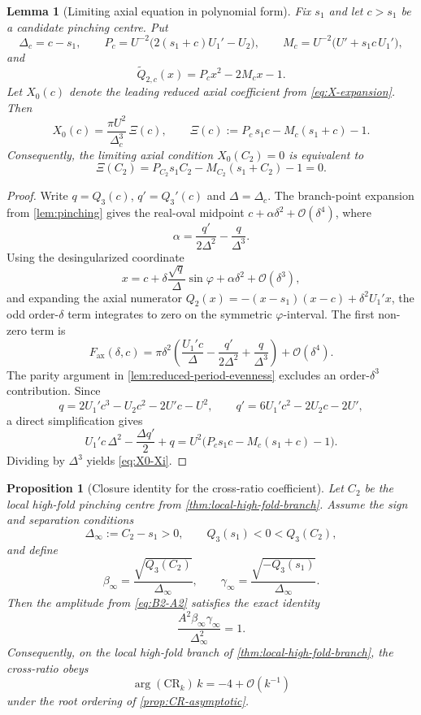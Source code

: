 \documentclass[11pt,a4paper]{article}
\theoremstyle{plain}
\newtheorem{proposition}[theorem]{Proposition}
\newtheorem{lemma}[theorem]{Lemma}
\theoremstyle{definition}
\theoremstyle{remark}
\newcommand{\Oo}{\mathcal{O}}
\begin{document}
\begin{lemma}[Limiting axial equation in polynomial form]
\label{lem:C1-limiting-axial}
Fix $s_1$ and let $c>s_1$ be a candidate pinching centre.  Put
\[
  \Delta_c=c-s_1,\qquad
  P_c=U^{-2}\bigl(2(s_1+c)U_1'-U_2\bigr),\qquad
  M_c=U^{-2}\bigl(U'+s_1c\,U_1'\bigr),
\]
and
\[
  \tilde Q_{2,c}(x)=P_cx^2-2M_cx-1 .
\]
Let $X_0(c)$ denote the leading reduced axial coefficient from
\cref{eq:X-expansion}.  Then
\begin{equation}\label{eq:X0-Xi}
  X_0(c)
  =
  \frac{\pi U^2}{\Delta_c^3}\,
  \Xi(c),
  \qquad
  \Xi(c):=P_c\,s_1c-M_c(s_1+c)-1 .
\end{equation}
Consequently, the limiting axial condition $X_0(C_2)=0$ is
equivalent to
\begin{equation}\label{eq:Xi-zero}
  \Xi(C_2)=P_{C_2}s_1C_2-M_{C_2}(s_1+C_2)-1=0 .
\end{equation}
\end{lemma}

\begin{proof}
Write $q=Q_3(c)$, $q'=Q_3'(c)$ and
$\Delta=\Delta_c$.  The branch-point expansion from
\cref{lem:pinching} gives the real-oval midpoint
$c+\alpha\delta^2+\Oo(\delta^4)$, where
\[
  \alpha=\frac{q'}{2\Delta^2}-\frac{q}{\Delta^3}.
\]
Using the desingularized coordinate
\[
  x=c+\delta\frac{\sqrt q}{\Delta}\sin\varphi+\alpha\delta^2
     +\Oo(\delta^3),
\]
and expanding the axial numerator
$Q_2(x)=-(x-s_1)(x-c)+\delta^2U_1'x$, the odd
order-$\delta$ term integrates to zero on the symmetric
$\varphi$-interval.  The first non-zero term is
\[
  F_{\mathrm{ax}}(\delta,c)
  =
  \pi\delta^2
  \left(
    \frac{U_1'c}{\Delta}
    -\frac{q'}{2\Delta^2}
    +\frac{q}{\Delta^3}
  \right)
  +\Oo(\delta^4).
\]
The parity argument in \cref{lem:reduced-period-evenness} excludes an
order-$\delta^3$ contribution.  Since
\[
  q=2U_1'c^3-U_2c^2-2U'c-U^2,
  \qquad
  q'=6U_1'c^2-2U_2c-2U',
\]
a direct simplification gives
\[
  U_1'c\,\Delta^2-\frac{\Delta q'}{2}+q
  =
  U^2\bigl(P_cs_1c-M_c(s_1+c)-1\bigr).
\]
Dividing by $\Delta^3$ yields \eqref{eq:X0-Xi}.
\end{proof}

\begin{proposition}[Closure identity for the cross-ratio coefficient]
\label{prop:C1-closure-identity}
Let $C_2$ be the local high-fold pinching centre from
\cref{thm:local-high-fold-branch}.  Assume the sign and separation
conditions
\[
  \Delta_\infty:=C_2-s_1>0,\qquad
  Q_3(s_1)<0<Q_3(C_2),
\]
and define
\[
  \beta_\infty=\frac{\sqrt{Q_3(C_2)}}{\Delta_\infty},
  \qquad
  \gamma_\infty=\frac{\sqrt{-Q_3(s_1)}}{\Delta_\infty}.
\]
Then the amplitude from \cref{eq:B2-A2} satisfies the exact identity
\begin{equation}\label{eq:C1-closure-identity}
  \frac{A^2\beta_\infty\gamma_\infty}{\Delta_\infty^2}=1 .
\end{equation}
Consequently, on the local high-fold branch of
\cref{thm:local-high-fold-branch}, the cross-ratio obeys
\begin{equation}\label{eq:C1-arg-limit}
  \arg(\mathrm{CR}_k)\,k=-4+\Oo(k^{-1})
\end{equation}
under the root ordering of \cref{prop:CR-asymptotic}.
\end{proposition}
\end{document}
